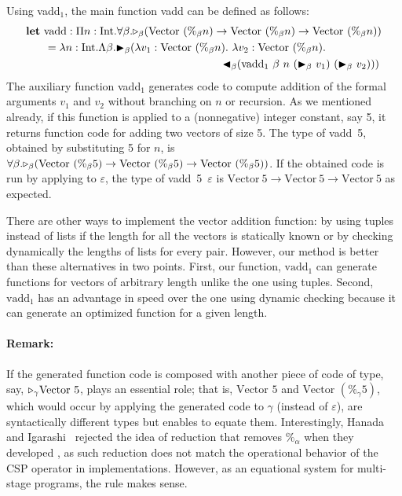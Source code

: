 Using vadd$_1$, the main function vadd can be defined as follows:
\renewcommand{\Vpn}{\text{Vector}\ (\%_\beta n)}
\begin{align*}
	  & \textbf{let}\ \text{vadd}: \Pi n:\I.\F\beta.\TW_\beta(\Vpn\to\Vpn\to\Vpn)                \\ 
	  & \hspace{6mm} = \lambda n:\I.\Lambda\beta.\TB_\beta (\lambda v_1:\Vpn.\ \lambda v_2:\Vpn. \\
	  & \hspace{63mm} \TBL_\beta (\text{vadd}_1\ \beta\ n\ (\TB_\beta\ v_1)\ (\TB_\beta\ v_2))) 
\end{align*}
\renewcommand{\Vpn}{\text{Vector}\ (\%_\beta 5)}%
The auxiliary function vadd$_1$ generates code to compute addition of
the formal arguments $v_1$ and $v_2$ without branching on $n$ or recursion.
As we mentioned already, if this function is applied to a
(nonnegative) integer constant, say 5, it returns function code for adding
two vectors of size 5.  The type of vadd\ 5, obtained by
substituting 5 for $n$, is
$\F\beta.\TW_\beta(\Vpn\to\Vpn\to\Vpn)$.
\renewcommand{\Vpn}{\text{Vector}\ 5}
If the obtained code is run by applying to \(\varepsilon\),
the type of vadd\ 5\ $\varepsilon$ is
\(\Vpn\to\Vpn\to\Vpn\) as expected.

There are other ways to implement the vector addition function:
by using tuples instead of lists if the length
for all the vectors is statically known or by checking dynamically the
lengths of lists for every pair.  However, our method is better than
these alternatives in two points.  First, our function, $\text{vadd}_1$
can generate functions for vectors of arbitrary length unlike the one
using tuples.  Second, $\text{vadd}_1$ has an advantage in speed over
the one using dynamic checking because it can generate an optimized
function for a given length.

\paragraph{Remark:}
If the generated function code is composed with another piece of code of type, say,
\({\mathop{\triangleright}}_\gamma \text{Vector }5\), \QPercent{} plays an essential role; that is,
\(\text{Vector }5\) and \(\text{Vector }(\%_\gamma 5)\), which would occur
by applying the generated code to \(\gamma\) (instead of \(\varepsilon\)), are syntactically
different types but \QPercent{} enables to equate them.
Interestingly, Hanada and Igarashi~\cite{Hanada2014} rejected the idea of
reduction that removes $\%_\alpha$ when they developed \LTP{}, as such
reduction does not match the operational behavior of the CSP operator in
implementations. However, as an equational system for multi-stage programs,
the rule \QPercent{} makes sense.


